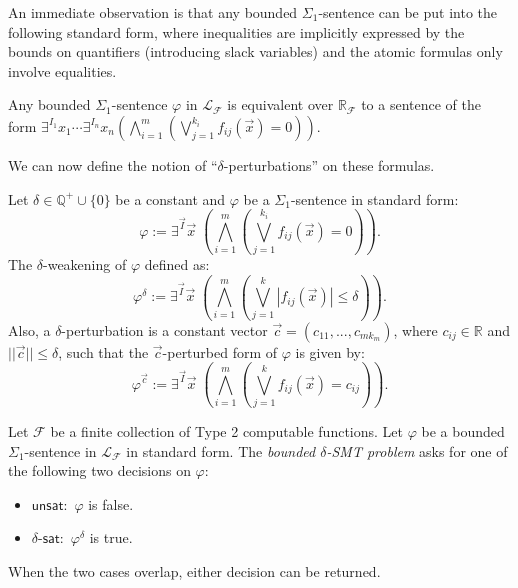 \documentclass[envcountsect]{llncs}
\begin{document}
An immediate observation is that any bounded $\Sigma_1$-sentence
can be put into the following standard form, where inequalities are implicitly
expressed by the bounds on quantifiers (introducing slack variables) and the
atomic formulas only involve equalities. 
\begin{proposition}\label{pre1}
Any bounded $\Sigma_1$-sentence $\varphi$ in $\mathcal{L}_{\mathcal{F}}$ is
equivalent over $\mathbb{R}_{\mathcal{F}}$ to a sentence of the form 
$\exists^{I_1}x_1\cdots \exists^{I_n}x_n(\bigwedge_{i=1}^m(\bigvee_{j=1}^{k_i}
f_{ij}(\vec x)=0)).$
\end{proposition}

We can now define the notion of ``$\delta$-perturbations'' on these
formulas. 
\begin{definition}\label{weak-def}
Let $\delta\in \mathbb{Q}^+\cup\{0\}$ be a constant and $\varphi$ be a
$\Sigma_1$-sentence in standard form:
\[\varphi:= \exists^{\vec I}\vec x\;(\bigwedge_{i=1}^m (\bigvee_{j=1}^{k_i}
f_{ij}(\vec x)= 0)).
\]
The $\delta$-weakening of $\varphi$ defined as:
\[\varphi^{\delta}:= \exists^{\vec I} \vec x\;(\bigwedge_{i=1}^m(\bigvee_{j=1}^k
|f_{ij}(\vec x)|\leq \delta)).\]
Also, a $\delta$-perturbation is a constant vector $\vec c =
(c_{11},...,c_{mk_m})$, where $c_{ij}\in\mathbb{R}$ and $||\vec
c||\leq\delta$, such that the $\vec c$-perturbed form of $\varphi$ is given by:
\[\varphi^{\vec c}:= \exists^{\vec I} \vec x\;(\bigwedge_{i=1}^m(\bigvee_{j=1}^k
f_{ij}(\vec x) = c_{ij})).\]
\end{definition}

\begin{definition} Let
$\mathcal{F}$ be a finite collection of Type 2 computable functions. Let
$\varphi$ be a bounded $\Sigma_1$-sentence in $\mathcal{L}_{\mathcal{F}}$ in
standard form. The {\em bounded $\delta$-SMT problem} asks for one of the
following two decisions on $\varphi$:
\begin{itemize}
\item $\mathsf{unsat}:$ $\varphi$ is false.
\item $\delta$-$\mathsf{sat}:$ $\varphi^{\delta}$ is true. 
\end{itemize}
When the two cases overlap, either decision can be returned. 
\end{definition}
\end{document}
